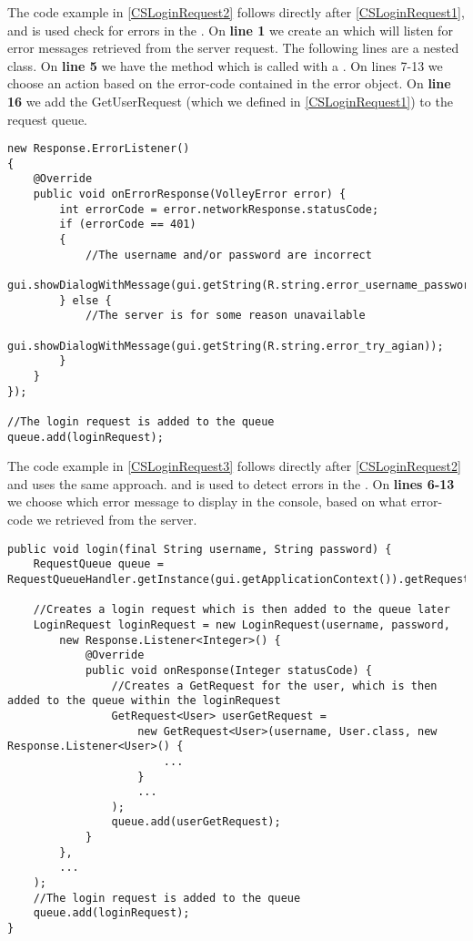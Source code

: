 The code example in \autoref{CSLoginRequest2} follows directly after
\autoref{CSLoginRequest1}, and is used check for errors in the
. On \textbf{line 1} we create an 
which will listen for error messages retrieved from the server request. The
following lines are a nested class. On \textbf{line 5} we have the
 method which is called with a . On
lines {7-13} we choose an action based on the error-code contained in the error
object. On \textbf{line 16} we add the GetUserRequest (which we defined in
\autoref{CSLoginRequest1}) to the request queue.\nl

\begin{minipage}[H]{\linewidth}
\begin{lstlisting}[caption = Using an errorListener to detect mishaps in the LoginRequest, label = CSLoginRequest3] 
new Response.ErrorListener() 
{
	@Override
    public void onErrorResponse(VolleyError error) {
        int errorCode = error.networkResponse.statusCode;
        if (errorCode == 401) 
        {
        	//The username and/or password are incorrect
            gui.showDialogWithMessage(gui.getString(R.string.error_username_password));
        } else {
            //The server is for some reason unavailable
            gui.showDialogWithMessage(gui.getString(R.string.error_try_agian));
        }
    }
});

//The login request is added to the queue
queue.add(loginRequest);
\end{lstlisting}
\end{minipage}

The code example in \autoref{CSLoginRequest3} follows directly after
\autoref{CSLoginRequest2} and uses the same approach. and is used to detect
errors in the . On \textbf{lines 6-13} we choose which error
message to display in the console, based on what error-code we retrieved from
the server.

\begin{minipage}[H]{\linewidth}
\begin{lstlisting}[caption = Using a RequestQueue to commicate with the server,
label = RequestQueue]
public void login(final String username, String password) {
    RequestQueue queue = RequestQueueHandler.getInstance(gui.getApplicationContext()).getRequestQueue();

    //Creates a login request which is then added to the queue later
    LoginRequest loginRequest = new LoginRequest(username, password,
        new Response.Listener<Integer>() {
            @Override
            public void onResponse(Integer statusCode) {
                //Creates a GetRequest for the user, which is then added to the queue within the loginRequest
                GetRequest<User> userGetRequest =
                    new GetRequest<User>(username, User.class, new Response.Listener<User>() {
                       	...
                    }
                    ...
                );
                queue.add(userGetRequest);
            }
        },
		...
    );
    //The login request is added to the queue
    queue.add(loginRequest);
}
\end{lstlisting}
\end{minipage}

